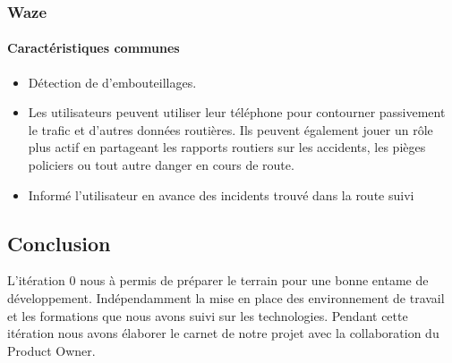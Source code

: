 \subsubsection{Waze}
\paragraph{Caractéristiques communes}
\begin{itemize}
 \item Détection de d'embouteillages.
 \item Les utilisateurs peuvent utiliser leur téléphone pour contourner passivement le trafic 
 et d'autres données routières. Ils peuvent également jouer un rôle plus actif en partageant 
 les rapports routiers sur les accidents, les pièges policiers ou tout autre danger en cours de route.
 \item Informé l'utilisateur en avance des incidents trouvé dans la route suivi
\end{itemize}

\subsection{Conclusion}

L'itération 0 nous à permis de préparer le terrain pour une bonne entame de
développement. Indépendamment la mise en place des environnement de travail et les
formations que nous avons suivi sur les technologies.
Pendant cette itération nous avons élaborer le carnet de notre projet avec la collaboration du Product
Owner.
